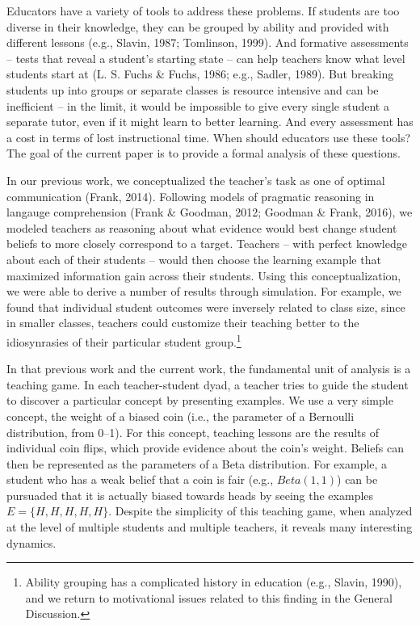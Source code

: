 \documentclass[10pt, letterpaper]{article}
\begin{document}
Educators have a variety of tools to address these problems. If students
are too diverse in their knowledge, they can be grouped by ability and
provided with different lessons (e.g., Slavin, 1987; Tomlinson, 1999).
And formative assessments -- tests that reveal a student's starting
state -- can help teachers know what level students start at (L. S.
Fuchs \& Fuchs, 1986; e.g., Sadler, 1989). But breaking students up into
groups or separate classes is resource intensive and can be inefficient
-- in the limit, it would be impossible to give every single student a
separate tutor, even if it might learn to better learning. And every
assessment has a cost in terms of lost instructional time. When should
educators use these tools? The goal of the current paper is to provide a
formal analysis of these questions.

In our previous work, we conceptualized the teacher's task as one of
optimal communication (Frank, 2014). Following models of pragmatic
reasoning in langauge comprehension (Frank \& Goodman, 2012; Goodman \&
Frank, 2016), we modeled teachers as reasoning about what evidence would
best change student beliefs to more closely correspond to a target.
Teachers -- with perfect knowledge about each of their students -- would
then choose the learning example that maximized information gain across
their students. Using this conceptualization, we were able to derive a
number of results through simulation. For example, we found that
individual student outcomes were inversely related to class size, since
in smaller classes, teachers could customize their teaching better to
the idiosynrasies of their particular student group.\footnote{Ability
  grouping has a complicated history in education (e.g., Slavin, 1990),
  and we return to motivational issues related to this finding in the
  General Discussion.}

In that previous work and the current work, the fundamental unit of
analysis is a teaching game. In each teacher-student dyad, a teacher
tries to guide the student to discover a particular concept by
presenting examples. We use a very simple concept, the weight of a
biased coin (i.e., the parameter of a Bernoulli distribution, from
0--1). For this concept, teaching lessons are the results of individual
coin flips, which provide evidence about the coin's weight. Beliefs can
then be represented as the parameters of a Beta distribution. For
example, a student who has a weak belief that a coin is fair (e.g.,
\(Beta(1,1)\)) can be pursuaded that it is actually biased towards heads
by seeing the examples \(E = \{H, H, H, H, H\}\). Despite the simplicity
of this teaching game, when analyzed at the level of multiple students
and multiple teachers, it reveals many interesting dynamics.
\end{document}
